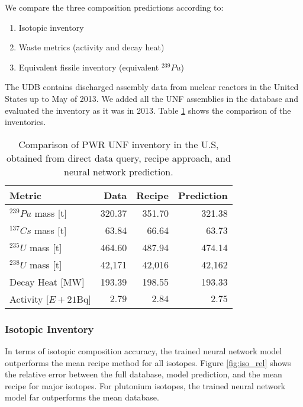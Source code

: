 We compare the three composition predictions according to:
\begin{enumerate}
    \item Isotopic inventory
    \item Waste metrics (activity and decay heat)
    \item Equivalent fissile inventory (equivalent $^{239}Pu$)
\end{enumerate}

The \gls{UDB} contains discharged assembly data
from nuclear reactors in the United States up to May of
2013. We added all the \gls{UNF} assemblies in the database
and evaluated the inventory as it was in 2013. 
Table \ref{tab:met} shows the comparison of the inventories.

\begin{table}[h]
    \centering
    \begin{tabular}{l|r|rr}
        \hline
        Metric & Data & Recipe & Prediction \\
        \hline
        $^{239}Pu$ mass [t] & 320.37 & 351.70 & 321.38\\
        $^{137}Cs$ mass [t] & 63.84 & 66.64 & 63.73 \\
        $^{235}U$ mass [t] & 464.60 & 487.94 & 474.14\\
        $^{238}U$ mass [t] & 42,171 & 42,016 & 42,162\\
        \hline
        Decay Heat [MW] & 193.39 & 198.55 & 193.33 \\
        Activity [$E+21$Bq] & $2.79$ & $2.84$ & $2.75$ \\
        \hline
    \end{tabular}
    \caption{Comparison of \gls{PWR} \gls{UNF} inventory in the U.S,
             obtained from direct data query, recipe approach,
             and neural network prediction. 
    \label{tab:met}}
\end{table}

\FloatBarrier

\subsubsection{Isotopic Inventory}

In terms of isotopic composition accuracy, the trained
neural network model outperforms the
mean recipe method for all isotopes.
Figure \ref{fig:iso_rel} shows the relative
error between the full database, model prediction, and
the mean recipe for
major isotopes. For plutonium isotopes, the trained neural
network model far
outperforms the mean database.

